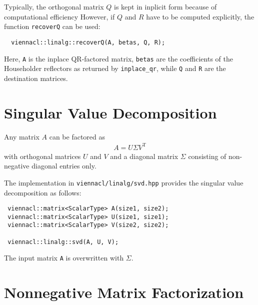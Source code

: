Typically, the orthogonal matrix $Q$ is kept in inplicit form because of computational efficiency
However, if $Q$ and $R$ have to be computed explicitly, the function \lstinline|recoverQ| can be used:
\begin{lstlisting}
  viennacl::linalg::recoverQ(A, betas, Q, R); 
\end{lstlisting}
Here, \lstinline|A| is the inplace QR-factored matrix, \lstinline|betas| are the coefficients of the Householder reflectors as returned by
\lstinline|inplace_qr|, while \lstinline|Q| and \lstinline|R| are the destination matrices.


\section{Singular Value Decomposition}


Any matrix $A$ can be factored as
\begin{align}
 A = U \Sigma V^{\mathrm{T}}
\end{align}
with orthogonal matrices $U$ and $V$ and a diagonal matrix $\Sigma$ consisting of non-negative diagonal entries only.

The implementation in \texttt{viennacl/linalg/svd.hpp} provides the singular value decomposition as follows:
\begin{lstlisting}
 viennacl::matrix<ScalarType> A(size1, size2);
 viennacl::matrix<ScalarType> U(size1, size1);
 viennacl::matrix<ScalarType> V(size2, size2);

 viennacl::linalg::svd(A, U, V);
\end{lstlisting}
The input matrix \lstinline|A| is overwritten with $\Sigma$.

\section{Nonnegative Matrix Factorization}

